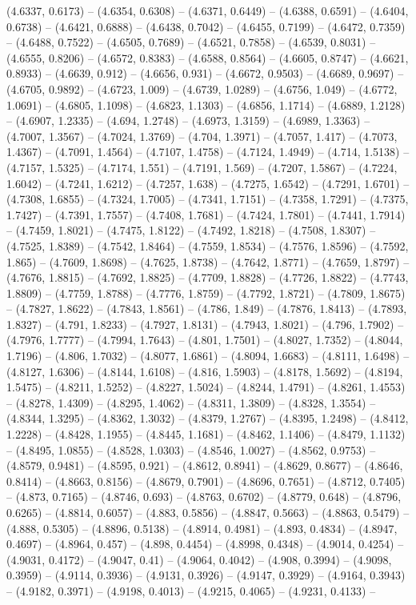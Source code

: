 (4.6337, 0.6173) -- (4.6354, 0.6308) -- (4.6371, 0.6449) -- (4.6388, 0.6591) -- (4.6404, 0.6738) -- (4.6421, 0.6888) -- (4.6438, 0.7042) -- (4.6455, 0.7199) -- (4.6472, 0.7359) -- (4.6488, 0.7522) -- (4.6505, 0.7689) -- (4.6521, 0.7858) -- (4.6539, 0.8031) -- (4.6555, 0.8206) -- (4.6572, 0.8383) -- (4.6588, 0.8564) -- (4.6605, 0.8747) -- (4.6621, 0.8933) -- (4.6639, 0.912) -- (4.6656, 0.931) -- (4.6672, 0.9503) -- (4.6689, 0.9697) -- (4.6705, 0.9892) -- (4.6723, 1.009) -- (4.6739, 1.0289) -- (4.6756, 1.049) -- (4.6772, 1.0691) -- (4.6805, 1.1098) -- (4.6823, 1.1303) -- (4.6856, 1.1714) -- (4.6889, 1.2128) -- (4.6907, 1.2335) -- (4.694, 1.2748) -- (4.6973, 1.3159) -- (4.6989, 1.3363) -- (4.7007, 1.3567) -- (4.7024, 1.3769) -- (4.704, 1.3971) -- (4.7057, 1.417) -- (4.7073, 1.4367) -- (4.7091, 1.4564) -- (4.7107, 1.4758) -- (4.7124, 1.4949) -- (4.714, 1.5138) -- (4.7157, 1.5325) -- (4.7174, 1.551) -- (4.7191, 1.569) -- (4.7207, 1.5867) -- (4.7224, 1.6042) -- (4.7241, 1.6212) -- (4.7257, 1.638) -- (4.7275, 1.6542) -- (4.7291, 1.6701) -- (4.7308, 1.6855) -- (4.7324, 1.7005) -- (4.7341, 1.7151) -- (4.7358, 1.7291) -- (4.7375, 1.7427) -- (4.7391, 1.7557) -- (4.7408, 1.7681) -- (4.7424, 1.7801) -- (4.7441, 1.7914) -- (4.7459, 1.8021) -- (4.7475, 1.8122) -- (4.7492, 1.8218) -- (4.7508, 1.8307) -- (4.7525, 1.8389) -- (4.7542, 1.8464) -- (4.7559, 1.8534) -- (4.7576, 1.8596) -- (4.7592, 1.865) -- (4.7609, 1.8698) -- (4.7625, 1.8738) -- (4.7642, 1.8771) -- (4.7659, 1.8797) -- (4.7676, 1.8815) -- (4.7692, 1.8825) -- (4.7709, 1.8828) -- (4.7726, 1.8822) -- (4.7743, 1.8809) -- (4.7759, 1.8788) -- (4.7776, 1.8759) -- (4.7792, 1.8721) -- (4.7809, 1.8675) -- (4.7827, 1.8622) -- (4.7843, 1.8561) -- (4.786, 1.849) -- (4.7876, 1.8413) -- (4.7893, 1.8327) -- (4.791, 1.8233) -- (4.7927, 1.8131) -- (4.7943, 1.8021) -- (4.796, 1.7902) -- (4.7976, 1.7777) -- (4.7994, 1.7643) -- (4.801, 1.7501) -- (4.8027, 1.7352) -- (4.8044, 1.7196) -- (4.806, 1.7032) -- (4.8077, 1.6861) -- (4.8094, 1.6683) -- (4.8111, 1.6498) -- (4.8127, 1.6306) -- (4.8144, 1.6108) -- (4.816, 1.5903) -- (4.8178, 1.5692) -- (4.8194, 1.5475) -- (4.8211, 1.5252) -- (4.8227, 1.5024) -- (4.8244, 1.4791) -- (4.8261, 1.4553) -- (4.8278, 1.4309) -- (4.8295, 1.4062) -- (4.8311, 1.3809) -- (4.8328, 1.3554) -- (4.8344, 1.3295) -- (4.8362, 1.3032) -- (4.8379, 1.2767) -- (4.8395, 1.2498) -- (4.8412, 1.2228) -- (4.8428, 1.1955) -- (4.8445, 1.1681) -- (4.8462, 1.1406) -- (4.8479, 1.1132) -- (4.8495, 1.0855) -- (4.8528, 1.0303) -- (4.8546, 1.0027) -- (4.8562, 0.9753) -- (4.8579, 0.9481) -- (4.8595, 0.921) -- (4.8612, 0.8941) -- (4.8629, 0.8677) -- (4.8646, 0.8414) -- (4.8663, 0.8156) -- (4.8679, 0.7901) -- (4.8696, 0.7651) -- (4.8712, 0.7405) -- (4.873, 0.7165) -- (4.8746, 0.693) -- (4.8763, 0.6702) -- (4.8779, 0.648) -- (4.8796, 0.6265) -- (4.8814, 0.6057) -- (4.883, 0.5856) -- (4.8847, 0.5663) -- (4.8863, 0.5479) -- (4.888, 0.5305) -- (4.8896, 0.5138) -- (4.8914, 0.4981) -- (4.893, 0.4834) -- (4.8947, 0.4697) -- (4.8964, 0.457) -- (4.898, 0.4454) -- (4.8998, 0.4348) -- (4.9014, 0.4254) -- (4.9031, 0.4172) -- (4.9047, 0.41) -- (4.9064, 0.4042) -- (4.908, 0.3994) -- (4.9098, 0.3959) -- (4.9114, 0.3936) -- (4.9131, 0.3926) -- (4.9147, 0.3929) -- (4.9164, 0.3943) -- (4.9182, 0.3971) -- (4.9198, 0.4013) -- (4.9215, 0.4065) -- (4.9231, 0.4133) -- 